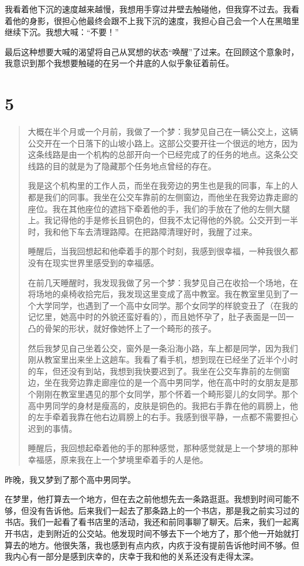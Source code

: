 我看着他下沉的速度越来越慢，我想用手穿过井壁去触碰他，但我穿不过去。我看着他的身影，很担心他最终会跟不上我下沉的速度，我担心自己会一个人在黑暗里继续下沉。我想大喊：“不要！”

最后这种想要大喊的渴望将自己从冥想的状态“唤醒”了过来。在回顾这个意象时，我意识到那个我想要触碰的在另一个井底的人似乎象征着前任。


\section*{5}

\blockquote{
	大概在半个月或一个月前，我做了一个梦：我梦见自己在一辆公交上，这辆公交开在一个日落下的山坡小路上。这部公交要开往一个很远的地方，因为这条线路是由一个机构的总部开向一个已经完成了的任务的地点。这条公交线路的目的就是为了隐藏那个任务地点曾经的存在。

	我是这个机构里的工作人员，而坐在我旁边的男生也是我的同事，车上的人都是我们的同事。我坐在公交车靠前的左侧窗边，而他坐在我旁边靠走廊的座位。我在其他座位的遮挡下牵着他的手，我们的手放在了他的左侧大腿上。我记得他的手是修长且铜色的，但我不太记得他的外貌。公交开到一半时，我和他下车去清理路障。在把路障清理好时，我醒了过来。

	睡醒后，当我回想起和他牵着手的那个时刻，我感到很幸福，一种我很久都没有在现实世界里感受到的幸福感。

	在前几天睡醒时，我发现我做了另一个梦：我梦见自己在收拾一个场地，在将场地的桌椅收拾完后，我发现这里变成了高中教室。我在教室里见到了一个大学同学，也遇到了一个高中女同学。那个女同学的样貌变丑了（在我的记忆里，她高中时的外貌还蛮好看的），而且她怀孕了，肚子表面是一凹一凸的骨架的形状，就好像她怀上了一个畸形的孩子。

	然后我梦见自己坐着公交，窗外是一条沿海小路，车上都是同学，因为我们刚从教室里出来坐上这趟车。我看了看手机，想到现在已经坐了近半个小时的车，但还没有到站，我想到我快要迟到了。我坐在公交车靠前的左侧窗边，坐在我旁边靠走廊座位的是一个高中男同学，他在高中时的女朋友是那个刚刚在教室里遇见的那个女同学，那个怀着一个畸形婴儿的女同学。那个高中男同学的身材是瘦高的，皮肤是铜色的。我把右手靠在他的肩膀上，他的左手牵着我靠在他右边肩膀上的右手。我感到很平静，一点都不需要担心迟到的事情。

	睡醒后，我回想起牵着他的手的那种感觉，那种感觉就是上一个梦境的那种幸福感，原来我在上一个梦境里牵着手的人是他。

}

昨晚，我又梦到了那个高中男同学。

在梦里，他打算去一个地方，但在去之前他想先去一条路逛逛。我想到时间可能不够，但没有告诉他。后来我们一起去了那条路上的一个书店，那是我之前实习过的书店。我们一起看了看书店里的活动，我还和前同事聊了聊天。后来，我们一起离开书店，走到附近的公交站。他发现时间不够去下一个地方了，那个他一开始就打算去的地方。他很失落，我也感到有点内疚，内疚于没有提前告诉他时间不够。但我内心有一部分是感到庆幸的，庆幸于我和他的关系还没有走得太深。

